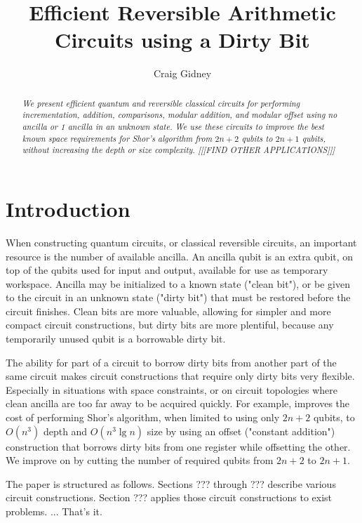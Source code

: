 \documentclass[twocolumn]{article}
\title{Efficient Reversible Arithmetic Circuits using a Dirty Bit}
\author{Craig Gidney}
\begin{document}
\maketitle

\begin{abstract}
\em
We present efficient quantum and reversible classical circuits for performing incrementation, addition, comparisons, modular addition, and modular offset using no ancilla or 1 ancilla in an unknown state.
We use these circuits to improve the best known space requirements for Shor's algorithm from $2n+2$ qubits to $2n+1$ qubits, without increasing the depth or size complexity.
[[[FIND OTHER APPLICATIONS]]]
\end{abstract}

\section{Introduction}

When constructing quantum circuits, or classical reversible circuits, an important resource is the number of available ancilla.
An ancilla qubit is an extra qubit, on top of the qubits used for input and output, available for use as temporary workspace.
Ancilla may be initialized to a known state ("clean bit"), or be given to the circuit in an unknown state ("dirty bit") that must be restored before the circuit finishes.
Clean bits are more valuable, allowing for simpler and more compact circuit constructions, but dirty bits are more plentiful, because any temporarily unused qubit is a borrowable dirty bit.

The ability for part of a circuit to borrow dirty bits from another part of the same circuit makes circuit constructions that require only dirty bits very flexible.
Especially in situations with space constraints, or on circuit topologies where clean ancilla are too far away to be acquired quickly.
For example, \cite{haner2016} improves the cost of performing Shor's algorithm, when limited to using only $2n+2$ qubits, to $O(n^3)$ depth and $O(n^3 \lg n)$ size by using an offset ("constant addition") construction that borrows dirty bits from one register while offsetting the other.
We improve on \cite{haner2016} by cutting the number of required qubits from $2n+2$ to $2n+1$.

The paper is structured as follows.
Sections ??? through ??? describe various circuit constructions.
Section ??? applies those circuit constructions to exist problems.
... That's it.
\end{document}
